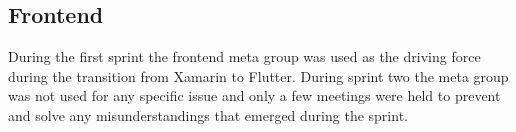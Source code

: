 \subsection{Frontend}
During the first sprint the frontend meta group was used as the driving force during the transition from Xamarin to Flutter.
During sprint two the meta group was not used for any specific issue and only a few meetings were held to prevent and solve any misunderstandings that emerged during the sprint.
